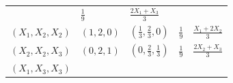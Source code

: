 \documentclass[]{book}
\theoremstyle{definition}
\theoremstyle{definition}
\theoremstyle{definition}
\theoremstyle{remark}
\begin{document}
\begin{longtable}[]{@{}lllll@{}}
\begin{minipage}[t]{0.16\columnwidth}
\end{minipage} & \begin{minipage}[t]{0.17\columnwidth}\raggedright\strut
\(\frac{1}{9}\)\strut
\end{minipage} & \begin{minipage}[t]{0.18\columnwidth}\raggedright\strut
\(\frac{2X_1+X_3}{3}\)\strut
\end{minipage}\tabularnewline
\begin{minipage}[t]{0.18\columnwidth}\raggedright\strut
\(\left( X_1,X_2,X_2 \right)\)\strut
\end{minipage} & \begin{minipage}[t]{0.16\columnwidth}\raggedright\strut
\(\left( 1,2,0 \right)\)\strut
\end{minipage} & \begin{minipage}[t]{0.16\columnwidth}\raggedright\strut
\(\left( \frac{1}{3},\frac{2}{3},0 \right)\)\strut
\end{minipage} & \begin{minipage}[t]{0.17\columnwidth}\raggedright\strut
\(\frac{1}{9}\)\strut
\end{minipage} & \begin{minipage}[t]{0.18\columnwidth}\raggedright\strut
\(\frac{X_1+2X_2}{3}\)\strut
\end{minipage}\tabularnewline
\begin{minipage}[t]{0.18\columnwidth}\raggedright\strut
\(\left( X_2,X_2,X_3 \right)\)\strut
\end{minipage} & \begin{minipage}[t]{0.16\columnwidth}\raggedright\strut
\(\left( 0,2,1 \right)\)\strut
\end{minipage} & \begin{minipage}[t]{0.16\columnwidth}\raggedright\strut
\(\left( 0,\frac{2}{3},\frac{1}{3} \right)\)\strut
\end{minipage} & \begin{minipage}[t]{0.17\columnwidth}\raggedright\strut
\(\frac{1}{9}\)\strut
\end{minipage} & \begin{minipage}[t]{0.18\columnwidth}\raggedright\strut
\(\frac{2X_2+X_3}{3}\)\strut
\end{minipage}\tabularnewline
\begin{minipage}[t]{0.18\columnwidth}\raggedright\strut
\(\left( X_1,X_3,X_3 \right)\)\strut
\end{minipage} & \begin{minipage}[t]{0.16\columnwidth}\raggedright\strut

\end{minipage}
\end{longtable}
\end{document}
